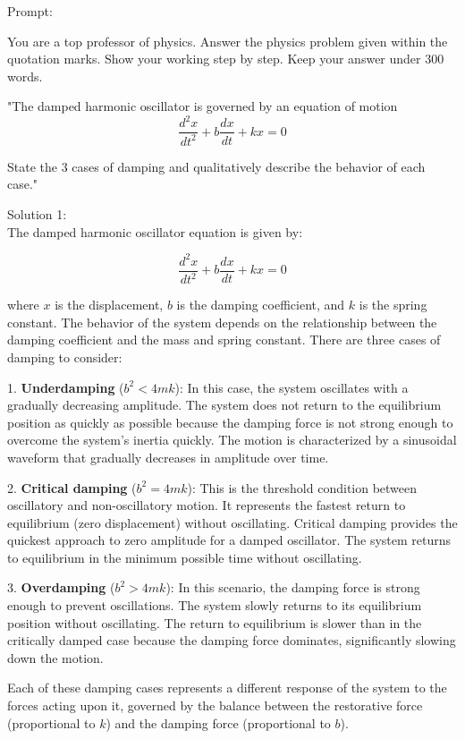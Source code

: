 \documentclass[a4paper,11pt]{article}
\begin{document}
Prompt:
\begin{spverbatim}
    You are a top professor of physics. Answer the physics problem given within the quotation marks. Show your working step by step. Keep your answer under 300 words.

    "The damped harmonic oscillator is governed by an equation of motion
    \[
    \frac{d^{2}x}{dt^{2}} + b\frac{dx}{dt}+kx=0
    \]

    State the 3 cases of damping and qualitatively describe the behavior of each case."
\end{spverbatim}

\bigskip

\noindent Solution 1: \\

The damped harmonic oscillator equation is given by:

\[
\frac{d^{2}x}{dt^{2}} + b\frac{dx}{dt}+kx=0
\]

where \(x\) is the displacement, \(b\) is the damping coefficient, and \(k\) is the spring constant. The behavior of the system depends on the relationship between the damping coefficient and the mass and spring constant. There are three cases of damping to consider:

1. \textbf{Underdamping} (\(b^2 < 4mk\)): In this case, the system oscillates with a gradually decreasing amplitude. The system does not return to the equilibrium position as quickly as possible because the damping force is not strong enough to overcome the system's inertia quickly. The motion is characterized by a sinusoidal waveform that gradually decreases in amplitude over time.

2. \textbf{Critical damping} (\(b^2 = 4mk\)): This is the threshold condition between oscillatory and non-oscillatory motion. It represents the fastest return to equilibrium (zero displacement) without oscillating. Critical damping provides the quickest approach to zero amplitude for a damped oscillator. The system returns to equilibrium in the minimum possible time without oscillating.

3. \textbf{Overdamping} (\(b^2 > 4mk\)): In this scenario, the damping force is strong enough to prevent oscillations. The system slowly returns to its equilibrium position without oscillating. The return to equilibrium is slower than in the critically damped case because the damping force dominates, significantly slowing down the motion.

Each of these damping cases represents a different response of the system to the forces acting upon it, governed by the balance between the restorative force (proportional to \(k\)) and the damping force (proportional to \(b\)). \\
\end{document}
